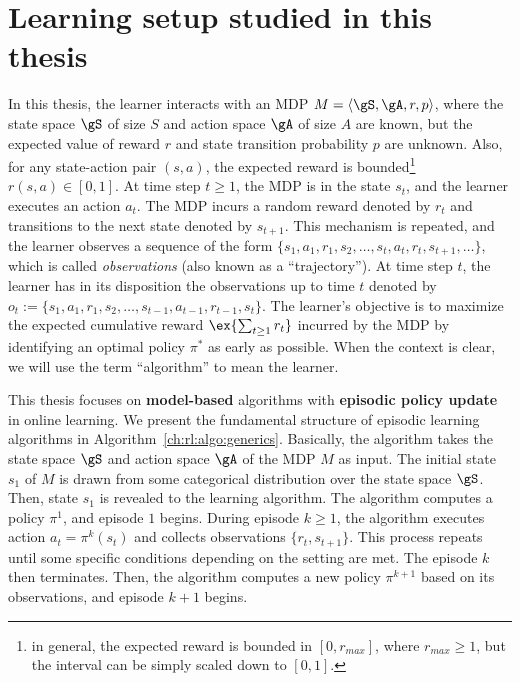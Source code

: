 \section{Learning setup studied in this thesis}
\label{sec:intro_learning}

In this thesis, the learner interacts with an MDP $M=\langle\gS,\gA,r,p\rangle$, where the state space $\gS$ of size $S$ and action space $\gA$ of size $A$ are known, but the expected value of reward $r$ and state transition probability $p$ are unknown.
Also, for any state-action pair $(s,a)$, the expected reward is bounded\footnote{in general, the expected reward is bounded in $[0, r_{max}]$, where $r_{max}\ge1$, but the interval can be simply scaled down to $[0,1]$.} $r(s,a)\in[0,1]$.
At time step $t\ge1$, the MDP is in the state $s_t$, and the learner executes an action $a_t$.
The MDP incurs a random reward denoted by $r_t$ and transitions to the next state denoted by $s_{t+1}$.
This mechanism is repeated, and the learner observes a sequence of the form $\{s_1,a_1,r_1,s_2,\dots,s_t,a_t,r_t,s_{t+1},\dots\}$, which is called \emph{observations} (also known as a ``trajectory'').
At time step $t$, the learner has in its disposition the observations up to time $t$ denoted by $o_t:=\{s_1,a_1,r_1,s_2,\dots,s_{t-1},a_{t-1},r_{t-1},s_{t}\}$.
The learner's objective is to maximize the expected cumulative reward $\ex{\sum_{t\ge1}r_t}$ incurred by the MDP by identifying an optimal policy $\pi^*$ as early as possible.
When the context is clear, we will use the term ``algorithm'' to mean the learner.

This thesis focuses on \textbf{model-based} algorithms with \textbf{episodic policy update} in online learning.
We present the fundamental structure of episodic learning algorithms in Algorithm~\ref{ch:rl:algo:generics}.
Basically, the algorithm takes the state space $\gS$ and action space $\gA$ of the MDP $M$ as input.
The initial state $s_1$ of $M$ is drawn from some categorical distribution over the state space $\gS$.
Then, state $s_1$ is revealed to the learning algorithm.
The algorithm computes a policy $\pi^1$, and episode $1$ begins.
During episode $k\ge1$, the algorithm executes action $a_t=\pi^k(s_t)$ and collects observations $\{r_t, s_{t+1}\}$.
This process repeats until some specific conditions depending on the setting are met.
The episode $k$ then terminates.
Then, the algorithm computes a new policy $\pi^{k+1}$ based on its observations, and episode $k+1$ begins.

